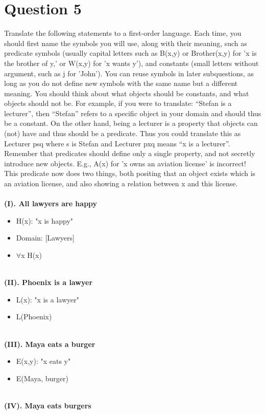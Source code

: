 \documentclass[a4paper]{article}
\begin{document}
\newpage
\section{Question 5}
Translate the following statements to a first-order language. Each time, you should first name the
symbols you will use, along with their meaning, such as predicate symbols (usually capital letters
such as B(x,y) or Brother(x,y) for 'x is the brother of y,' or W(x,y) for 'x wants y'), and constants
(small letters without argument, such as j for 'John'). You can reuse symbols in later subquestions,
as long as you do not define new symbols with the same name but a different meaning.
You should think about what objects should be constants, and what objects should not be. For
example, if you were to translate: “Stefan is a lecturer”, then “Stefan” refers to a specific object in
your domain and should thus be a constant. On the other hand, being a lecturer is a property that
objects can (not) have and thus should be a predicate. Thus you could translate this as Lecturer psq
where s is Stefan and Lecturer pxq means “x is a lecturer”.
Remember that predicates should define only a single property, and not secretly introduce new
objects. E.g., A(x) for 'x owns an aviation license' is incorrect! This predicate now does two things,
both positing that an object exists which is an aviation license, and also showing a relation between
x and this license.
\\\\
\textbf{(I). All lawyers are happy}
\begin{itemize}
    \item H(x): "x is happy"
    \item Domain: [Lawyers]
    \item $\forall $x H(x)
\end{itemize}
\ \\
\textbf{(II). Phoenix is a lawyer}
\begin{itemize}
    \item L(x): "x is a lawyer"
    \item L(Phoenix)
\end{itemize}
\ \\
\textbf{(III). Maya eats a burger}
\begin{itemize}
    \item E(x,y): "x eats y"
    \item E(Maya, burger)
\end{itemize}
\ \\
\textbf{(IV). Maya eats burgers}
\end{document}
